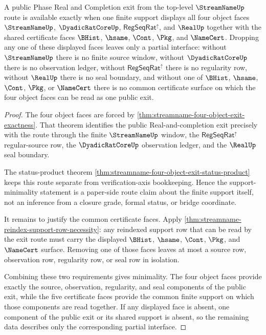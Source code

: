 \begin{theorem}
\label{thm:streamname-four-object-exit-support-minimality}
A public Phase Real and Completion exit from the top-level $\StreamNameUp$ route is available exactly when one finite support displays all four object faces $\StreamNameUp$, $\DyadicRatCoreUp$, $\mathsf{RegSeqRat}^{\uparrow}$, and $\RealUp$ together with the shared certificate faces $\BHist$, $\hsame$, $\Cont$, $\Pkg$, and $\NameCert$. Dropping any one of these displayed faces leaves only a partial interface: without $\StreamNameUp$ there is no finite source window, without $\DyadicRatCoreUp$ there is no observation ledger, without $\mathsf{RegSeqRat}^{\uparrow}$ there is no regularity row, without $\RealUp$ there is no seal boundary, and without one of $\BHist$, $\hsame$, $\Cont$, $\Pkg$, or $\NameCert$ there is no common certificate surface on which the four object faces can be read as one public exit.
\end{theorem}
\begin{proof}
The four object faces are forced by \autoref{thm:streamname-four-object-exit-exactness}. That theorem identifies the public Real-and-completion exit precisely with the route through the finite $\StreamNameUp$ window, the $\mathsf{RegSeqRat}^{\uparrow}$ regular-source row, the $\DyadicRatCoreUp$ observation ledger, and the $\RealUp$ seal boundary.

The status-product theorem \autoref{thm:streamname-four-object-exit-status-product} keeps this route separate from verification-axis bookkeeping. Hence the support-minimality statement is a paper-side route claim about the finite support itself, not an inference from a closure grade, formal status, or bridge coordinate.

It remains to justify the common certificate faces. Apply \autoref{thm:streamname-reindex-support-row-necessity}: any reindexed support row that can be read by the exit route must carry the displayed $\BHist$, $\hsame$, $\Cont$, $\Pkg$, and $\NameCert$ surface. Removing one of those faces leaves at most a source row, observation row, regularity row, or seal row in isolation.

Combining these two requirements gives minimality. The four object faces provide exactly the source, observation, regularity, and seal components of the public exit, while the five certificate faces provide the common finite support on which those components are read together. If any displayed face is absent, one component of the public exit or its shared support is absent, so the remaining data describes only the corresponding partial interface.
\end{proof}
